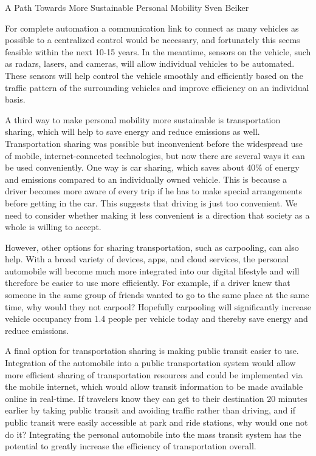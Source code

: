 \documentclass[10.5pt]{papertex}
\begin{document}
\begin{news}{2}{A Path Towards More Sustainable Personal Mobility}{
    Sven Beiker}{}{}

For complete automation a communication link to connect as many vehicles as 
possible to a centralized control would be necessary, and fortunately this 
seems feasible within the next 10-15 years. In the meantime, sensors on the 
vehicle, such as radars, lasers, and cameras, will allow individual vehicles 
to be automated. These sensors will help control the vehicle smoothly and 
efficiently based on the traffic pattern of the surrounding vehicles and 
improve efficiency on an individual basis.

A third way to make personal mobility more sustainable is transportation 
sharing, which will help to save energy and reduce emissions as well. 
Transportation sharing was possible but inconvenient before the widespread 
use of mobile, internet-connected technologies, but now there are several ways 
it can be used conveniently. One way is car sharing, which saves about 40\% of 
energy and emissions compared to an individually owned vehicle. This is 
because a driver becomes more aware of every trip if he has to make special 
arrangements before getting in the car. This suggests that driving is just too 
convenient. We need to consider whether making it less convenient is a 
direction that society as a whole is willing to accept.

However, other options for sharing transportation, such as carpooling, can 
also help. With a broad variety of devices, apps, and cloud services, the 
personal automobile will become much more integrated into our digital 
lifestyle and will therefore be easier to use more efficiently. For example, 
if a driver knew that someone in the same group of friends wanted to go to the 
same place at the same time, why would they not carpool? Hopefully carpooling 
will significantly increase vehicle occupancy from 1.4 people per vehicle today 
and thereby save energy and reduce emissions.

A final option for transportation sharing is making public transit easier to 
use. Integration of the automobile into a public transportation system would 
allow more efficient sharing of transportation resources and could be 
implemented via the mobile internet, which would allow transit information to 
be made available online in real-time. If travelers know they can get to their 
destination 20 minutes earlier by taking public transit and avoiding traffic 
rather than driving, and if public transit were easily accessible at park and 
ride stations, why would one not do it? Integrating the personal automobile 
into the mass transit system has the potential to greatly increase the 
efficiency of transportation overall.


\end{news}
\end{document}
